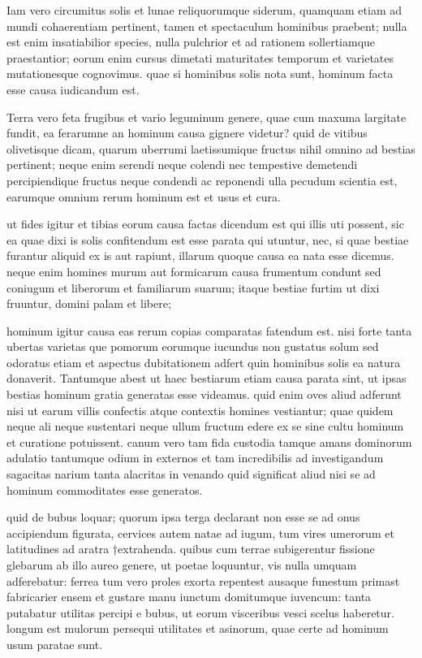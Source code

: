  Iam vero circumitus solis et lunae reliquorumque siderum, quamquam etiam ad mundi cohaerentiam pertinent, tamen et spectaculum hominibus praebent; nulla est enim insatiabilior species, nulla pulchrior et ad rationem sollertiamque praestantior; eorum enim cursus dimetati maturitates temporum et varietates mutationesque cognovimus. quae si hominibus solis nota sunt, hominum facta esse causa iudicandum est.

 Terra vero feta frugibus et vario leguminum genere, quae cum maxuma largitate fundit, ea ferarumne an hominum causa gignere videtur? quid de vitibus olivetisque dicam, quarum uberrumi laetissumique fructus nihil omnino ad bestias pertinent; neque enim serendi neque colendi nec tempestive demetendi percipiendique fructus neque condendi ac reponendi ulla pecudum scientia est, earumque omnium rerum hominum est et usus et cura.

 ut fides igitur et tibias eorum causa factas dicendum est qui illis uti possent, sic ea quae dixi is solis confitendum est esse parata qui utuntur, nec, si quae bestiae furantur aliquid ex is aut rapiunt, illarum quoque causa ea nata esse dicemus. neque enim homines murum aut formicarum causa frumentum condunt sed coniugum et liberorum et familiarum suarum; itaque bestiae furtim ut dixi fruuntur, domini palam et libere;

 hominum igitur causa eas rerum copias comparatas fatendum est. nisi forte tanta ubertas varietas que pomorum eorumque iucundus non gustatus solum sed odoratus etiam et aspectus dubitationem adfert quin hominibus solis ea natura donaverit. Tantumque abest ut haec bestiarum etiam causa parata sint, ut ipsas bestias hominum gratia generatas esse videamus. quid enim oves aliud adferunt nisi ut earum villis confectis atque contextis homines vestiantur; quae quidem neque ali neque sustentari neque ullum fructum edere ex se sine cultu hominum et curatione potuissent. canum vero tam fida custodia tamque amans dominorum adulatio tantumque odium in externos et tam incredibilis ad investigandum sagacitas narium tanta alacritas in venando quid significat aliud nisi se ad hominum commoditates esse generatos.

 quid de bubus loquar; quorum ipsa terga declarant non esse se ad onus accipiendum figurata, cervices autem natae ad iugum, tum vires umerorum et latitudines ad aratra †extrahenda. quibus cum terrae subigerentur fissione glebarum ab illo aureo genere, ut poetae loquuntur, vis nulla umquam adferebatur: ferrea tum vero proles exorta repentest ausaque funestum primast fabricarier ensem et gustare manu iunctum domitumque iuvencum: tanta putabatur utilitas percipi e bubus, ut eorum visceribus vesci scelus haberetur. longum est mulorum persequi utilitates et asinorum, quae certe ad hominum usum paratae sunt.

